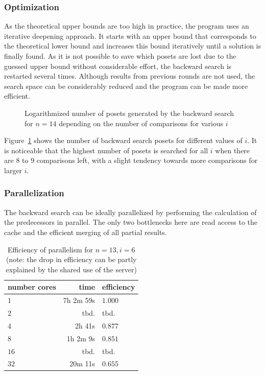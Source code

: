 \documentclass[10pt,journal,compsoc]{IEEEtran}
\begin{document}
\subsubsection{Optimization}

As the theoretical upper bounds are too high in practice, the program uses an iterative deepening approach.
It starts with an upper bound that corresponds to the theoretical lower bound and increases this bound iteratively until a solution is finally found.
As it is not possible to save which posets are lost due to the guessed upper bound without considerable effort, the backward search is restarted several times.
Although results from previous rounds are not used, the search space can be considerably reduced and the program can be made more efficient.

\begin{figure}[!b]
  \centering
  
  \caption{Logarithmized number of posets generated by the backward search for $n = 14$ depending on the number of comparisons for various $i$}
  \label{fig:backward-posets-per-level}
\end{figure}

Figure~\ref{fig:backward-posets-per-level} shows the number of backward search posets for different values of $i$.
It is noticeable that the highest number of posets is searched for all $i$ when there are $8$ to $9$ comparisons left, with a slight tendency towards more comparisons for larger $i$.


\subsubsection{Parallelization} \label{sec:backward:parallelisation}

The backward search can be ideally parallelized by performing the calculation of the predecessors in parallel.
The only two bottlenecks here are read access to the cache and the efficient merging of all partial results.

\begin{table}[!t]
  \renewcommand{\arraystretch}{1.2}
  \caption{Efficiency of parallelism for $n = 13, i = 6$ (note: the drop in efficiency can be partly explained by the shared use of the server)}
  \label{table:backward-parallel}
  \centering
  \begin{tabular}{l|r|l}
    number cores & time      & efficiency \\
    \hline
    $1$          & 7h 2m 59s & $1.000$    \\
    $2$          & tbd.      & tbd.       \\  %
    $4$          & 2h 41s    & $0.877$    \\
    $8$          & 1h 2m 9s  & $0.851$    \\
    $16$         & tbd.      & tbd.       \\ %
    $32$         & 20m 11s   & $0.655$    \\ %
  \end{tabular}
\end{table}
\end{document}
